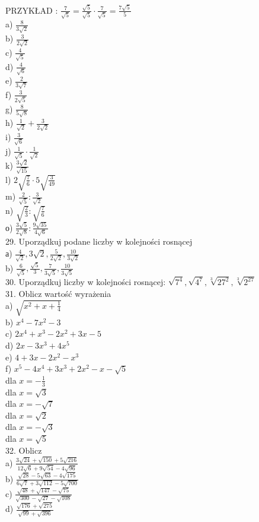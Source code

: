 \documentclass[10pt]{article}
\begin{document}
PRZYKŁAD : \(\frac{7}{\sqrt{5}}=\frac{\sqrt{5}}{\sqrt{5}} \cdot \frac{7}{\sqrt{5}}=\frac{7 \sqrt{5}}{5}\)\\
a) \(\frac{8}{3 \sqrt{2}}\)\\
b) \(\frac{3}{2 \sqrt{2}}\)\\
c) \(\frac{4}{\sqrt{5}}\)\\
d) \(\frac{4}{\sqrt{6}}\)\\
e) \(\frac{2}{3 \sqrt{7}}\)\\
f) \(\frac{3}{2 \sqrt{5}}\)\\
g) \(\frac{8}{5 \sqrt{8}}\)\\
h) \(\frac{1}{\sqrt{2}}+\frac{3}{2 \sqrt{2}}\)\\
i) \(\frac{3}{\sqrt{6}}\)\\
j) \(\frac{1}{\sqrt{5}} \cdot \frac{1}{\sqrt{2}}\)\\
k) \(\frac{3 \sqrt{2}}{\sqrt{15}}\)\\
l) \(2 \sqrt{\frac{7}{6}} \cdot 5 \sqrt{\frac{3}{49}}\)\\
m) \(\frac{2}{\sqrt{5}}: \frac{3}{\sqrt{2}}\)\\
n) \(\sqrt{\frac{2}{3}}: \sqrt{\frac{7}{6}}\)\\
о) \(\frac{3 \sqrt{5}}{2 \sqrt{8}}: \frac{9 \sqrt{35}}{4 \sqrt{6}}\)\\
29. Uporządkuj podane liczby w kolejności rosnącej\\
а) \(\frac{4}{\sqrt{2}}, 3 \sqrt{2}, \frac{5}{2 \sqrt{2}}, \frac{10}{3 \sqrt{2}}\)\\
b) \(\frac{6}{\sqrt{5}}, \frac{\sqrt{5}}{3}, \frac{7}{3 \sqrt{5}}, \frac{10}{3 \sqrt{5}}\)\\
30. Uporządkuj liczby w kolejności rosnącej: \(\sqrt{7^{4}}, \sqrt{4^{7}}, \sqrt[3]{27^{2}}, \sqrt[3]{2^{27}}\)\\
31. Oblicz wartość wyrażenia\\
a) \(\sqrt{x^{2}+x+\frac{1}{4}}\)\\
b) \(x^{4}-7 x^{2}-3\)\\
c) \(2 x^{4}+x^{3}-2 x^{2}+3 x-5\)\\
d) \(2 x-3 x^{3}+4 x^{5}\)\\
e) \(4+3 x-2 x^{2}-x^{3}\)\\
f) \(x^{5}-4 x^{4}+3 x^{3}+2 x^{2}-x-\sqrt{5}\)\\
dla \(x=-\frac{1}{3}\)\\
dla \(x=\sqrt{3}\)\\
dla \(x=-\sqrt{7}\)\\
dla \(x=\sqrt{2}\)\\
dla \(x=-\sqrt{3}\)\\
dla \(x=\sqrt{5}\)\\
32. Oblicz\\
a) \(\frac{3 \sqrt{24}+\sqrt{150}+5 \sqrt{216}}{12 \sqrt{6}+9 \sqrt{54}-4 \sqrt{96}}\)\\
b) \(\frac{\sqrt{28}-5 \sqrt{63}-4 \sqrt{175}}{6 \sqrt{7}+3 \sqrt{112}-5 \sqrt{700}}\)\\
c) \(\frac{\sqrt{48}+\sqrt{147}-\sqrt{75}}{\sqrt{300}-\sqrt{27}-\sqrt{108}}\)\\
d) \(\frac{\sqrt{176}+\sqrt{275}}{\sqrt{99}+\sqrt{396}}\)
\end{document}
